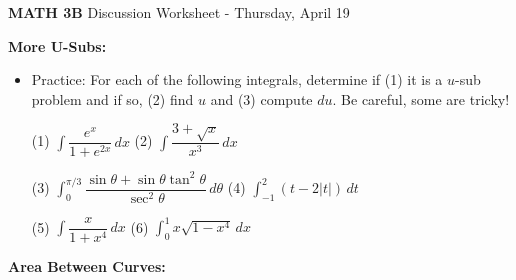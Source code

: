 \documentclass[12pt]{report}
\newcommand{\ds}{\displaystyle}
\begin{document}
\begin{center}
\textbf{{\LARGE MATH 3B}  \hfill} Discussion Worksheet - Thursday, April 19\\

\end{center}


\noindent\textbf{More U-Subs:}

\begin{itemize}

\item Practice: For each of the following integrals, determine if (1) it is a $u$-sub problem and if so, (2) find $u$ and (3) compute $du$. Be careful, some are tricky!


(1) $\ds \int \dfrac{e^x}{1+e^{2x}} \, dx$ \hspace{1.75in} (2) $\ds \int \dfrac{3 + \sqrt{x}}{x^3} \, dx$

\vspace{1in}

(3) $\ds \int_0^{\pi/3} \dfrac{\sin\theta + \sin\theta\tan^2\theta}{\sec^2\theta} \, d\theta$ \hspace{0.82in} (4) $\ds \int_{-1}^2 (t-2|t|) \, dt$

\vspace{1in}

(5) $\ds \int \dfrac{x}{1+x^4} \, dx$ \hspace{1.8in} (6) $\ds \int_0^1 x \sqrt{1-x^4} \, dx$

\vspace{0.75in}


\end{itemize}


\noindent\textbf{Area Between Curves:}
\end{document}
